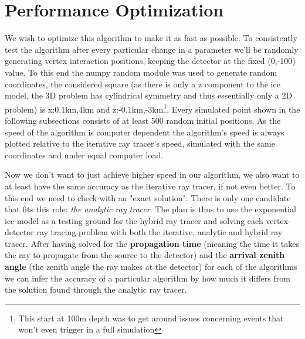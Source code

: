\section{Performance Optimization} 
We wish to optimize this algorithm to make
it as fast as possible.  To consistently test the algorithm after every
particular change in a parameter we'll be randomly generating vertex
interaction positions, keeping the detector at the fixed (0,-100) value.  To
this end the numpy random module was used to generate random coordinates, the
considered square (as there is only a z component to the ice model, the 3D
problem has cylindrical symmetry and thus essentially only a 2D problem) is
x:0.1km,4km and z:-0.1km,-3km\footnote{This start at 100m depth was to get
around issues concerning events that won't even trigger in a full simulation}.
Every simulated point shown in the following subsections consists of at least
500 random initial positions.  As the speed of the algorithm is computer
dependent the algorithm's speed is always plotted relative to the iterative ray
tracer's speed, simulated with the same coordinates and under equal computer load.

Now we don't want to just achieve higher speed in our algorithm, we also want
to at least have the same accuracy as the iterative ray tracer, if not even better.
To this end we need to check with an "exact solution". There is only one candidate
that fits this role: \textit{the analytic ray tracer}. The plan is thus to use the
exponential ice model as a testing ground for the hybrid ray tracer and solving each
vertex-detector ray tracing problem with both the iterative, analytic and hybrid ray tracer.
After having solved for the \textbf{propagation time} (meaning the time it takes the ray to
propagate from the source to the detector) and the \textbf{arrival zenith angle} (the zenith angle
the ray makes at the detector) for each of the algorithms we can infer the accuracy of a particular
algorithm by how much it differs from the solution found through the analytic ray tracer.
